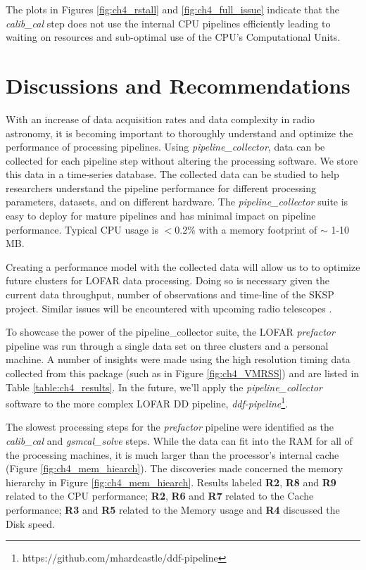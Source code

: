 The plots in Figures \ref{fig:ch4_rstall} and \ref{fig:ch4_full_issue} indicate that the \textit{calib\_cal} step does not use the internal CPU pipelines efficiently leading to waiting on resources and sub-optimal use of the CPU's Computational Units.

\section{Discussions and Recommendations}

With an increase of data acquisition rates and data complexity in radio astronomy, it is becoming important to thoroughly understand and optimize the performance of processing pipelines. Using \textit{pipeline\_collector}, data can be collected for each pipeline step without altering the processing software. We store this data in a time-series database. The collected data can be studied to help researchers understand the pipeline performance for different processing parameters, datasets, and on different hardware. The \textit{pipeline\_collector} suite is easy to deploy for mature pipelines and has minimal impact on pipeline performance. Typical CPU usage is $<$0.2\% with a memory footprint of $\sim$ 1-10 MB.

Creating a performance model with the collected data will allow us to to optimize future clusters for LOFAR data processing. Doing so is necessary given the current data throughput, number of observations and time-line of the SKSP project. Similar issues will be encountered with upcoming radio telescopes \citep{meerkat_ska_size}.


To showcase the power of the pipeline\_collector suite, the LOFAR \textit{prefactor} pipeline was run through a single data set on three clusters and a personal machine. A number of insights were made using the high resolution timing data collected from this package (such as in Figure \ref{fig:ch4_VMRSS}) and are listed in Table \ref{table:ch4_results}. In the future, we'll apply the \textit{pipeline\_collector} software to the more complex LOFAR DD pipeline, \textit{ddf-pipeline}\footnote{https://github.com/mhardcastle/ddf-pipeline}. 

The slowest processing steps for the \textit{prefactor} pipeline were identified as the \textit{calib\_cal} and \textit{gsmcal\_solve} steps. While the data can fit into the RAM for all of the processing machines, it is much larger than the processor's internal cache (Figure \ref{fig:ch4_mem_hiearch}).  The discoveries made concerned the memory hierarchy in Figure \ref{fig:ch4_mem_hiearch}. Results labeled \textbf{R2}, \textbf{R8} and \textbf{R9} related to the CPU performance; \textbf{R2}, \textbf{R6} and \textbf{R7} related to the Cache performance; \textbf{R3} and \textbf{R5} related to the Memory usage and \textbf{R4} discussed the Disk speed. 

